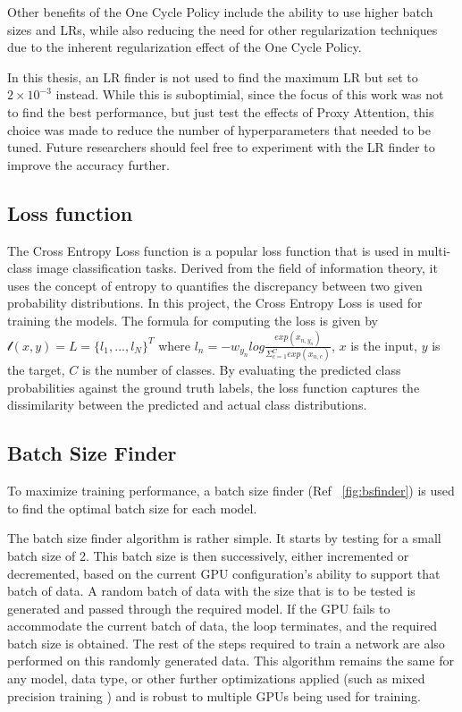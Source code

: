 Other benefits of the One Cycle Policy include the ability to use higher batch sizes and LRs, while also reducing the need for other regularization techniques due to the inherent regularization effect of the One Cycle Policy.

In this thesis, an LR finder is not used to find the maximum LR but set to $2\times 10^{-3}$ instead. While this is suboptimial, since the focus of this work was not to find the best performance, but just test the effects of Proxy Attention, this choice was made to reduce the number of hyperparameters that needed to be tuned. Future researchers should feel free to experiment with the LR finder to improve the accuracy further.

\subsection{Loss function}
The Cross Entropy Loss function is a popular loss function that is used in multi-class image classification tasks. Derived from the field of information theory, it uses the concept of entropy to quantifies the discrepancy between two given probability distributions. In this project, the Cross Entropy Loss is used for training the models. The formula for computing the loss is given by $\mathscr{l}(x,y) = L = \{l_{1}, ..., l_{N}\}^{T}$ where $l_{n} = -w_{y_{n}}log \frac{exp(x_{n, y_{n}})}{\Sigma_{c=1}^{C}exp(x_{n,c})}$, $x$ is the input, $y$ is the target, $C$ is the number of classes. By evaluating the predicted class probabilities against the ground truth labels, the loss function captures the dissimilarity between the predicted and actual class distributions. 

\subsection{Batch Size Finder}
To maximize training performance, a batch size finder (Ref ~\ref{fig:bsfinder}) is used to find the optimal batch size for each model.

The batch size finder algorithm is rather simple. It starts by testing for a small batch size of 2. This batch size is then successively, either incremented or decremented, based on the current GPU configuration's ability to support that batch of data.
A random batch of data with the size that is to be tested is generated and passed through the required model. If the GPU fails to accommodate the current batch of data, the loop terminates, and the required batch size is obtained. The rest of the steps required to train a network are also performed on this randomly generated data.
This algorithm remains the same for any model, data type, or other further optimizations applied (such as mixed precision training \cite{micikeviciusMixedPrecisionTraining2017}) and is robust to multiple GPUs being used for training.

